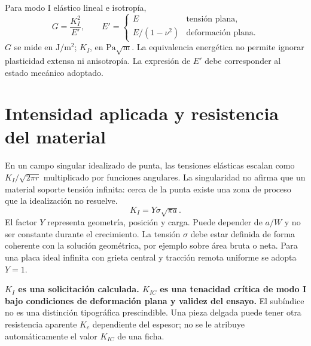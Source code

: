 Para modo I elástico lineal e isotropía,
\begin{equation}G=\frac{K_I^2}{E'},\qquad E'=\begin{cases}E&\text{tensión plana},\\ E/(1-\nu^2)&\text{deformación plana}.\end{cases}\label{eq:gk}\end{equation}
$G$ se mide en $\mathrm{J/m^2}$; $K_I$, en $\mathrm{Pa\sqrt m}$. La equivalencia energética no permite ignorar plasticidad extensa ni anisotropía. La expresión de $E'$ debe corresponder al estado mecánico adoptado.
\section{Intensidad aplicada y resistencia del material}
En un campo singular idealizado de punta, las tensiones elásticas escalan como $K_I/\sqrt{2\pi r}$ multiplicado por funciones angulares. La singularidad no afirma que un material soporte tensión infinita: cerca de la punta existe una zona de proceso que la idealización no resuelve.
\begin{equation}K_I=Y\sigma\sqrt{\pi a}.\label{eq:ki}\end{equation}
El factor $Y$ representa geometría, posición y carga. Puede depender de $a/W$ y no ser constante durante el crecimiento. La tensión $\sigma$ debe estar definida de forma coherente con la solución geométrica, por ejemplo sobre área bruta o neta. Para una placa ideal infinita con grieta central y tracción remota uniforme se adopta $Y=1$.

\textbf{$K_I$ es una solicitación calculada. $K_{IC}$ es una tenacidad crítica de modo I bajo condiciones de deformación plana y validez del ensayo.} El subíndice no es una distinción tipográfica prescindible. Una pieza delgada puede tener otra resistencia aparente $K_c$ dependiente del espesor; no se le atribuye automáticamente el valor $K_{IC}$ de una ficha.
